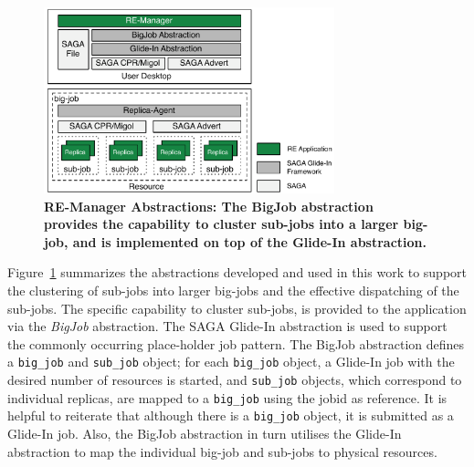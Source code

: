 \documentclass{rspublic}
\begin{document}
\begin{figure}[t]
    \begin{center}  
      \includegraphics[width=0.75\textwidth]{remdmanager_v12}
      \caption{\footnotesize \bf RE-Manager Abstractions: The BigJob
          abstraction provides the capability to cluster sub-jobs into a
          larger big-job, and is implemented on top of the Glide-In
          abstraction.\vspace*{-1em}}
     \label{fig:abstractions} 
    \end{center}
\end{figure}

Figure~\ref{fig:abstractions} summarizes the abstractions developed
and used in this work to support the clustering of sub-jobs into 
larger big-jobs and the effective dispatching of the sub-jobs.  The
specific capability to cluster sub-jobs, is provided to the
application via the \emph{BigJob} abstraction. 
The SAGA Glide-In abstraction is used to
support the commonly occurring place-holder job pattern.
The BigJob abstraction defines a \texttt{big\_job}
and \texttt{sub\_job} object; for each \texttt{big\_job}
object, a Glide-In job with the desired number of resources is
started, and \texttt{sub\_job} objects, which correspond to
individual replicas, are mapped to a \texttt{big\_job} using the jobid
as reference. It is helpful to reiterate that although there is a
\texttt{big\_job} object, it is submitted as a Glide-In job. Also, the
BigJob abstraction in turn utilises the Glide-In abstraction to map the
individual big-job and sub-jobs to physical resources.
\end{document}
